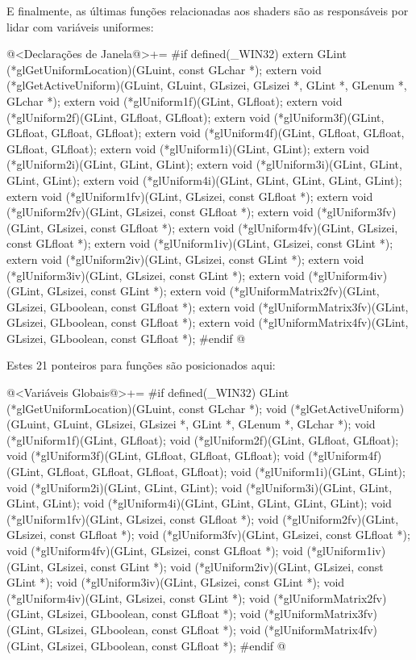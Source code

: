 E finalmente, as últimas funções relacionadas aos shaders são as
responsáveis por lidar com variáveis uniformes:

\iniciocodigo
@<Declarações de Janela@>+=
#if defined(_WIN32)
extern GLint (*glGetUniformLocation)(GLuint, const GLchar *);
extern void (*glGetActiveUniform)(GLuint, GLuint, GLsizei, GLsizei *, GLint *,
                                  GLenum *, GLchar *);
extern void (*glUniform1f)(GLint, GLfloat);
extern void (*glUniform2f)(GLint, GLfloat, GLfloat);
extern void (*glUniform3f)(GLint, GLfloat, GLfloat, GLfloat);
extern void (*glUniform4f)(GLint, GLfloat, GLfloat, GLfloat, GLfloat);
extern void (*glUniform1i)(GLint, GLint);
extern void (*glUniform2i)(GLint, GLint, GLint);
extern void (*glUniform3i)(GLint, GLint, GLint, GLint);
extern void (*glUniform4i)(GLint, GLint, GLint, GLint, GLint);
extern void (*glUniform1fv)(GLint, GLsizei, const GLfloat *);
extern void (*glUniform2fv)(GLint, GLsizei, const GLfloat *);
extern void (*glUniform3fv)(GLint, GLsizei, const GLfloat *);
extern void (*glUniform4fv)(GLint, GLsizei, const GLfloat *);
extern void (*glUniform1iv)(GLint, GLsizei, const GLint *);
extern void (*glUniform2iv)(GLint, GLsizei, const GLint *);
extern void (*glUniform3iv)(GLint, GLsizei, const GLint *);
extern void (*glUniform4iv)(GLint, GLsizei, const GLint *);
extern void (*glUniformMatrix2fv)(GLint, GLsizei, GLboolean, const GLfloat *);
extern void (*glUniformMatrix3fv)(GLint, GLsizei, GLboolean, const GLfloat *);
extern void (*glUniformMatrix4fv)(GLint, GLsizei, GLboolean, const GLfloat *);
#endif
@
\fimcodigo

Estes 21 ponteiros para funções são posicionados aqui:

\iniciocodigo
@<Variáveis Globais@>+=
#if defined(_WIN32)
GLint (*glGetUniformLocation)(GLuint, const GLchar *);
void (*glGetActiveUniform)(GLuint, GLuint, GLsizei, GLsizei *, GLint *,
                           GLenum *, GLchar *);
void (*glUniform1f)(GLint, GLfloat);
void (*glUniform2f)(GLint, GLfloat, GLfloat);
void (*glUniform3f)(GLint, GLfloat, GLfloat, GLfloat);
void (*glUniform4f)(GLint, GLfloat, GLfloat, GLfloat, GLfloat);
void (*glUniform1i)(GLint, GLint);
void (*glUniform2i)(GLint, GLint, GLint);
void (*glUniform3i)(GLint, GLint, GLint, GLint);
void (*glUniform4i)(GLint, GLint, GLint, GLint, GLint);
void (*glUniform1fv)(GLint, GLsizei, const GLfloat *);
void (*glUniform2fv)(GLint, GLsizei, const GLfloat *);
void (*glUniform3fv)(GLint, GLsizei, const GLfloat *);
void (*glUniform4fv)(GLint, GLsizei, const GLfloat *);
void (*glUniform1iv)(GLint, GLsizei, const GLint *);
void (*glUniform2iv)(GLint, GLsizei, const GLint *);
void (*glUniform3iv)(GLint, GLsizei, const GLint *);
void (*glUniform4iv)(GLint, GLsizei, const GLint *);
void (*glUniformMatrix2fv)(GLint, GLsizei, GLboolean, const GLfloat *);
void (*glUniformMatrix3fv)(GLint, GLsizei, GLboolean, const GLfloat *);
void (*glUniformMatrix4fv)(GLint, GLsizei, GLboolean, const GLfloat *);
#endif
@
\fimcodigo

